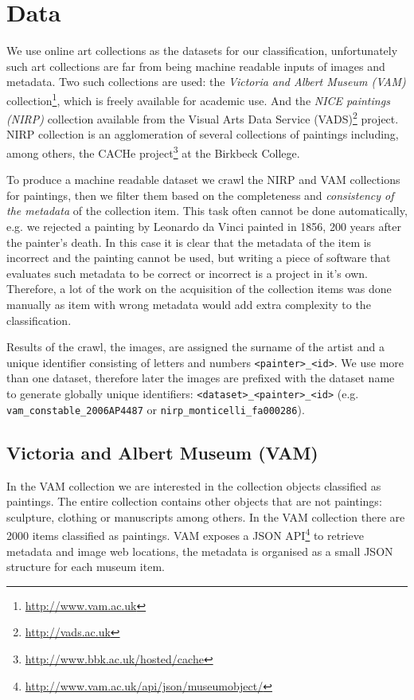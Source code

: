 \documentclass[11pt,a4paper,twoside,openright,draft]{report}
\begin{document}
\chapter{Data}
\label{chap:data}
\begin{multicols}{2}

We use online art collections as the datasets for our classification,
unfortunately such art collections are far from being machine readable inputs
of images and metadata.  Two such collections are used: the \emph{Victoria and
Albert Museum (VAM)} collection\footnote{\href{http://www.vam.ac.uk/}
{http://www.vam.ac.uk}}, which is freely available for academic use.  And the
\emph{NICE paintings (NIRP)} collection available from the Visual Arts Data
Service (VADS)\footnote{\href{http://vads.ac.uk/}{http://vads.ac.uk}} project.
NIRP collection is an agglomeration of several collections of paintings
including, among others, the CACHe project\footnote{
\href{http://www.bbk.ac.uk/hosted/cache/}{http://www.bbk.ac.uk/hosted/cache}}
at the Birkbeck College.

To produce a machine readable dataset we crawl the NIRP and VAM collections for
paintings, then we filter them based on the completeness and \emph{consistency
of the metadata} of the collection item.  This task often cannot be done
automatically, e.g. we rejected a painting by Leonardo da Vinci painted in
1856, 200 years after the painter's death.  In this case it is clear that the
metadata of the item is incorrect and the painting cannot be used, but writing
a piece of software that evaluates such metadata to be correct or incorrect is
a project in it's own.  Therefore, a lot of the work on the acquisition of the
collection items was done manually as item with wrong metadata would add extra
complexity to the classification.

Results of the crawl, the images, are assigned the surname of the artist and a
unique identifier consisting of letters and numbers \texttt{<painter>\_<id>}.
We use more than one dataset, therefore later the images are prefixed with the
dataset name to generate globally unique identifiers:
\texttt{<dataset>\_<painter>\_<id>} (e.g. \texttt{vam\_constable\_2006AP4487}
or \texttt{nirp\_monticelli\_fa000286}).

\section{Victoria and Albert Museum (VAM)}

In the VAM collection we are interested in the collection objects classified as
paintings.  The entire collection contains other objects that are not
paintings: sculpture, clothing or manuscripts among others.  In the VAM
collection there are 2000 items classified as paintings.  VAM exposes a JSON
API\footnote{\href{http://www.vam.ac.uk/api/json/museumobject/}
{http://www.vam.ac.uk/api/json/museumobject/}} to retrieve metadata and image
web locations, the metadata is organised as a small JSON structure for each
museum item.


\end{multicols}
\end{document}
